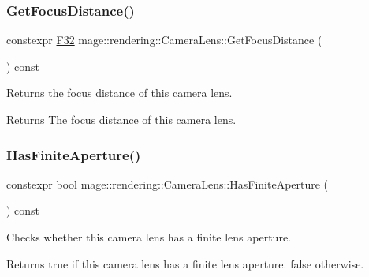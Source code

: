 \subsubsection{\texorpdfstring{Get\+Focus\+Distance()}{GetFocusDistance()}}
{\footnotesize\ttfamily constexpr \mbox{\hyperlink{namespacemage_aa97e833b45f06d60a0a9c4fc22ae02c0}{F32}} mage\+::rendering\+::\+Camera\+Lens\+::\+Get\+Focus\+Distance (\begin{DoxyParamCaption}{ }\end{DoxyParamCaption}) const\hspace{0.3cm}{\ttfamily [noexcept]}}

Returns the focus distance of this camera lens.

\begin{DoxyReturn}{Returns}
The focus distance of this camera lens. 
\end{DoxyReturn}
\mbox{\label{classmage_1_1rendering_1_1_camera_lens_a09a7cc18ca89da0c177c4f7dc0bbcc41}} 
\subsubsection{\texorpdfstring{Has\+Finite\+Aperture()}{HasFiniteAperture()}}
{\footnotesize\ttfamily constexpr bool mage\+::rendering\+::\+Camera\+Lens\+::\+Has\+Finite\+Aperture (\begin{DoxyParamCaption}{ }\end{DoxyParamCaption}) const\hspace{0.3cm}{\ttfamily [noexcept]}}

Checks whether this camera lens has a finite lens aperture.

\begin{DoxyReturn}{Returns}
{\ttfamily true} if this camera lens has a finite lens aperture. {\ttfamily false} otherwise. 
\end{DoxyReturn}
\mbox{\label{classmage_1_1rendering_1_1_camera_lens_a1b61b2f225578e1a71d5e3101cd1b0ec}} 

